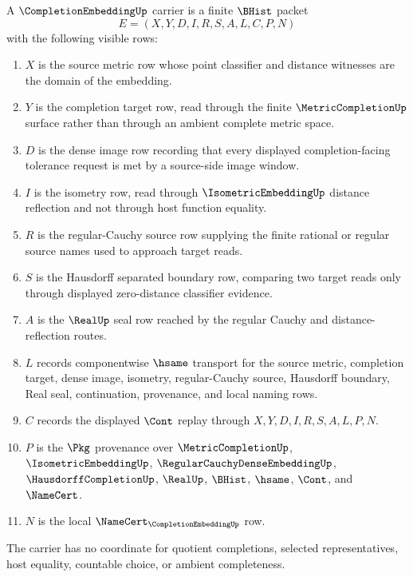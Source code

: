 \begin{definition}
\label{def:completion-embedding-carrier}
A $\CompletionEmbeddingUp$ carrier is a finite $\BHist$ packet
$$
E=(X,Y,D,I,R,S,A,L,C,P,N)
$$
with the following visible rows:
\begin{enumerate}
\item $X$ is the source metric row whose point classifier and distance witnesses are the domain of the embedding.
\item $Y$ is the completion target row, read through the finite $\MetricCompletionUp$ surface rather than through an ambient complete metric space.
\item $D$ is the dense image row recording that every displayed completion-facing tolerance request is met by a source-side image window.
\item $I$ is the isometry row, read through $\IsometricEmbeddingUp$ distance reflection and not through host function equality.
\item $R$ is the regular-Cauchy source row supplying the finite rational or regular source names used to approach target reads.
\item $S$ is the Hausdorff separated boundary row, comparing two target reads only through displayed zero-distance classifier evidence.
\item $A$ is the $\RealUp$ seal row reached by the regular Cauchy and distance-reflection routes.
\item $L$ records componentwise $\hsame$ transport for the source metric, completion target, dense image, isometry, regular-Cauchy source, Hausdorff boundary, Real seal, continuation, provenance, and local naming rows.
\item $C$ records the displayed $\Cont$ replay through $X,Y,D,I,R,S,A,L,P,N$.
\item $P$ is the $\Pkg$ provenance over $\MetricCompletionUp$, $\IsometricEmbeddingUp$, $\RegularCauchyDenseEmbeddingUp$, $\HausdorffCompletionUp$, $\RealUp$, $\BHist$, $\hsame$, $\Cont$, and $\NameCert$.
\item $N$ is the local $\NameCert_{\CompletionEmbeddingUp}$ row.
\end{enumerate}
The carrier has no coordinate for quotient completions, selected representatives, host equality, countable choice, or ambient completeness.
\end{definition}

